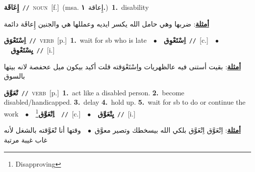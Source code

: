 \documentclass[10pt,a4paper,twoside]{article} %
\begin{document}
\begin{multicols}{2}
{\setlength\topsep{0pt}\textbf{\foreignlanguage{arabic}{إِعَاقَة}}\ {\color{gray}\texttt{//}\color{black}}\ \textsc{noun}\ [f.]\ \color{gray}(msa. \foreignlanguage{arabic}{إِعاقة}~\foreignlanguage{arabic}{\textbf{١.}})\color{black}\ \textbf{1.}~disability\  \begin{flushright}\color{gray}\foreignlanguage{arabic}{\textbf{\underline{\foreignlanguage{arabic}{أمثلة}}}: ضربها وهي حامل الله يكسر ايديه وعمللها هي والجنين إِعاقَة دائمة}\end{flushright}\color{black}} \vspace{2mm}

{\setlength\topsep{0pt}\textbf{\foreignlanguage{arabic}{اِسْتَعْوَق}}\ {\color{gray}\texttt{//}\color{black}}\ \textsc{verb}\ [p.]\ \textbf{1.}~wait for sb who is late\ \ $\bullet$\ \ \setlength\topsep{0pt}\textbf{\foreignlanguage{arabic}{اِسْتَعْوِق}}\ {\color{gray}\texttt{//}\color{black}}\ [c.]\ \ $\bullet$\ \ \setlength\topsep{0pt}\textbf{\foreignlanguage{arabic}{يِسْتَعْوِق}}\ {\color{gray}\texttt{//}\color{black}}\ [i.]\  \begin{flushright}\color{gray}\foreignlanguage{arabic}{\textbf{\underline{\foreignlanguage{arabic}{أمثلة}}}: بقيت أستنى فيه عالظهريات واِسْتَعْوَقته قلت أكيد بيكون ميل عحفصة لانه بيتها بالسوق}\end{flushright}\color{black}} \vspace{2mm}

{\setlength\topsep{0pt}\textbf{\foreignlanguage{arabic}{تْعَوَّق}}\ {\color{gray}\texttt{//}\color{black}}\ \textsc{verb}\ [p.]\ \textbf{1.}~act like a disabled person.  \textbf{2.}~become disabled/handicapped.  \textbf{3.}~delay  \textbf{4.}~hold up.  \textbf{5.}~wait for sb to do or continue the work\ \ $\bullet$\ \ \setlength\topsep{0pt}\textbf{\foreignlanguage{arabic}{اِتْعَوَّق}}\footnote{Disapproving}\ \ {\color{gray}\texttt{//}\color{black}}\ [c.]\ \ $\bullet$\ \ \setlength\topsep{0pt}\textbf{\foreignlanguage{arabic}{يِتْعَوَّق}}\ {\color{gray}\texttt{//}\color{black}}\ [i.]\  \begin{flushright}\color{gray}\foreignlanguage{arabic}{\textbf{\underline{\foreignlanguage{arabic}{أمثلة}}}: اِتْعَوَّق اِتْعَوَّق بلكي الله بيسخطك وتصير معوَّق\ $\bullet$\ \  وقتها أنا تْعَوَّقته بالشغل لأنه غاب غيبة مرتبة}\end{flushright}\color{black}} \vspace{2mm}


\end{multicols}
\end{document}

